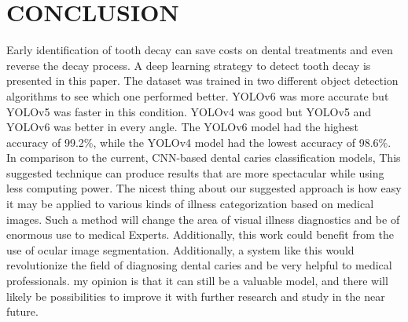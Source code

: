 \chapter{CONCLUSION}

Early identification of tooth decay can save costs on dental treatments and even reverse the decay process. A deep learning strategy to detect tooth decay is presented in this paper. The dataset was trained in two different object detection algorithms to see which one performed better. YOLOv6 was more accurate but YOLOv5 was faster in this condition. YOLOv4 was good but YOLOv5 and YOLOv6 was better in every angle. The YOLOv6 model had the highest accuracy of 99.2\%, while the YOLOv4 model had the lowest accuracy of 98.6\%.\\ 
In comparison to the current, CNN-based dental caries classification models, This suggested technique can produce results that are more spectacular while using less computing power. The nicest thing about our suggested approach is how easy it may be applied to various kinds of illness categorization based on medical images. Such a method will change the area of visual illness diagnostics and be of enormous use to medical Experts. Additionally, this work could benefit from the use of ocular image segmentation.  Additionally, a system like this would revolutionize the field of diagnosing dental caries and be very helpful to medical professionals. my opinion is that it can still be a valuable model, and there will likely be possibilities to improve it with further research and study in the near future.

